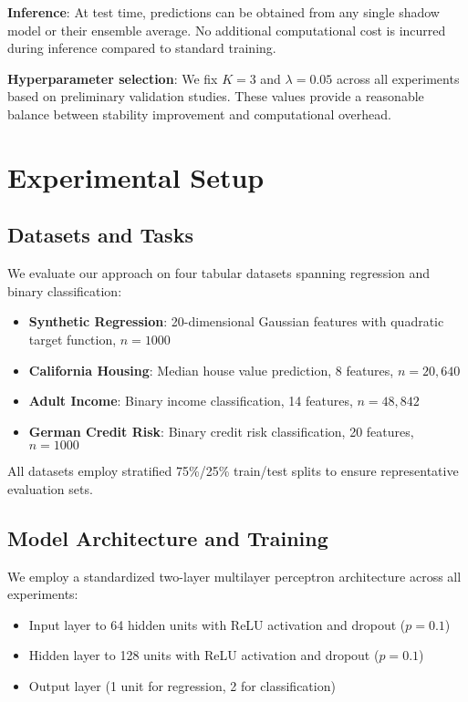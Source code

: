 \documentclass[12pt, letterpaper]{article}
\begin{document}
\textbf{Inference}: At test time, predictions can be obtained from any single shadow model or their ensemble average. No additional computational cost is incurred during inference compared to standard training.

\textbf{Hyperparameter selection}: We fix $K=3$ and $\lambda=0.05$ across all experiments based on preliminary validation studies. These values provide a reasonable balance between stability improvement and computational overhead.

\section{Experimental Setup}

\subsection{Datasets and Tasks}

We evaluate our approach on four tabular datasets spanning regression and binary classification:

\begin{itemize}
\item \textbf{Synthetic Regression}: 20-dimensional Gaussian features with quadratic target function, $n=1000$
\item \textbf{California Housing}: Median house value prediction, 8 features, $n=20{,}640$
\item \textbf{Adult Income}: Binary income classification, 14 features, $n=48{,}842$
\item \textbf{German Credit Risk}: Binary credit risk classification, 20 features, $n=1000$
\end{itemize}

All datasets employ stratified 75\%/25\% train/test splits to ensure representative evaluation sets.

\subsection{Model Architecture and Training}

We employ a standardized two-layer multilayer perceptron architecture across all experiments:
\begin{itemize}
\item Input layer to 64 hidden units with ReLU activation and dropout ($p=0.1$)
\item Hidden layer to 128 units with ReLU activation and dropout ($p=0.1$)  
\item Output layer (1 unit for regression, 2 for classification)
\end{itemize}
\end{document}
